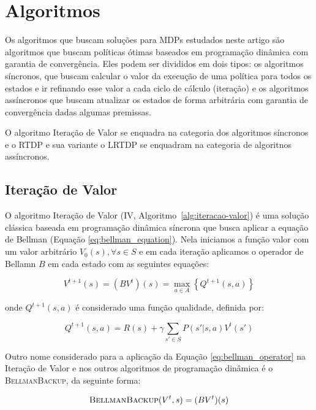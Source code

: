 \documentclass[letterpaper]{article}
\begin{document}
\section{Algoritmos}

Os algoritmos que buscam soluções para MDPs estudados neste artigo são algoritmos que buscam políticas ótimas baseados em programação dinâmica com garantia de convergência. Eles podem ser divididos em dois tipos: os algoritmos síncronos, que buscam calcular o valor da execução de uma política para todos os estados e ir refinando esse valor a cada ciclo de cálculo (iteração) e os algoritmos assíncronos que buscam atualizar os estados de forma arbitrária com garantia de convergência dadas algumas premissas.

O algoritmo Iteração de Valor \cite{Howard-1960} se enquadra na categoria dos algoritmos síncronos e o RTDP \cite{BartoBradtkeSingh-1995} e sua variante o LRTDP \cite{BonetGeffer-2003} se enquadram na categoria de algoritnos assíncronos.

\subsection{Iteração de Valor}

O algoritmo Iteração de Valor (IV, Algoritmo~\ref{alg:iteracao-valor}) é uma solução clássica baseada em programação dinâmica síncrona que busca aplicar a equação de Bellman (Equação \ref{eq:bellman_equation}). Nela iniciamos a função valor com um valor arbitrário $V_0(s), \forall s \in S$ e em cada iteração aplicamos o operador de Bellamn $B$ em cada estado com as seguintes equações:

\begin{equation} \label{eq:bellman_operator}
    V^{t+1}(s) = (BV^t)(s) = \max_{a \in A} \left\{ Q^{t+1}(s,a) \right\}
\end{equation}

onde $ Q^{t+1}(s,a) $ é considerado uma função qualidade, definida por:

\begin{equation} \label{eq:quality_function}
    Q^{t+1}(s,a) = R(s) + \gamma \sum_{s'\in S} P(s'|s,a)V^t(s')
\end{equation}

Outro nome considerado para a aplicação da Equação \ref{eq:bellman_operator} na Iteração de Valor e nos outros algoritmos de programação dinâmica é o \textsc{BellmanBackup}, da seguinte forma:

\begin{equation} \label{eq:bellman_backup}
    \textsc{BellmanBackup}(V^t, s) = (BV^t)(s)
\end{equation}
\end{document}
